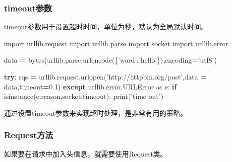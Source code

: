 \documentclass[]{ctexbook}
\newenvironment{Shaded}{\begin{snugshade}}{\end{snugshade}}
\newcommand{\BuiltInTok}[1]{#1}
\newcommand{\ControlFlowTok}[1]{\textcolor[rgb]{0.13,0.29,0.53}{\textbf{#1}}}
\newcommand{\FloatTok}[1]{\textcolor[rgb]{0.00,0.00,0.81}{#1}}
\newcommand{\ImportTok}[1]{#1}
\newcommand{\NormalTok}[1]{#1}
\newcommand{\OperatorTok}[1]{\textcolor[rgb]{0.81,0.36,0.00}{\textbf{#1}}}
\newcommand{\StringTok}[1]{\textcolor[rgb]{0.31,0.60,0.02}{#1}}
\begin{document}
\hypertarget{timeoutux53c2ux6570}{%
\subsubsection{timeout参数}\label{timeoutux53c2ux6570}}

timeout参数用于设置超时时间，单位为秒，默认为全局默认时间。

\begin{Shaded}
\begin{Highlighting}[]
\ImportTok{import}\NormalTok{ urllib.request}
\ImportTok{import}\NormalTok{ urllib.parse}
\ImportTok{import}\NormalTok{ socket}
\ImportTok{import}\NormalTok{ urllib.error}

\NormalTok{data }\OperatorTok{=} \BuiltInTok{bytes}\NormalTok{(urllib.parse.urlencode(\{}\StringTok{'word'}\NormalTok{:}\StringTok{'hello'}\NormalTok{\}),encoding}\OperatorTok{=}\StringTok{'utf8'}\NormalTok{)}

\ControlFlowTok{try}\NormalTok{:}
\NormalTok{    rqs }\OperatorTok{=}\NormalTok{ urllib.request.urlopen(}\StringTok{'http://httpbin.org/post'}\NormalTok{,data }\OperatorTok{=}\NormalTok{ data,timeout}\OperatorTok{=}\FloatTok{0.1}\NormalTok{)}
\ControlFlowTok{except}\NormalTok{ urllib.error.URLError }\ImportTok{as}\NormalTok{ e:}
    \ControlFlowTok{if} \BuiltInTok{isinstance}\NormalTok{(e.reason,socket.timeout):}
        \BuiltInTok{print}\NormalTok{(}\StringTok{'time out'}\NormalTok{)}
\end{Highlighting}
\end{Shaded}

通过设置timeout参数来实现超时处理，是非常有用的策略。

\hypertarget{requestux65b9ux6cd5}{%
\subsubsection{Request方法}\label{requestux65b9ux6cd5}}

如果要在请求中加入头信息，就需要使用Request类。
\end{document}
